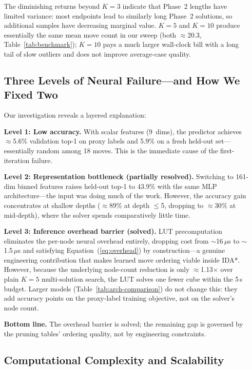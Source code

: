\documentclass[graybox]{svmult}
\begin{document}
The diminishing returns beyond $K{=}3$ indicate that Phase~2 lengths have limited variance: most endpoints lead to similarly long Phase~2 solutions, so additional samples have decreasing marginal value. $K{=}5$ and $K{=}10$ produce essentially the same mean move count in our sweep (both $\approx$20.3, Table~\ref{tab:benchmark}); $K{=}10$ pays a much larger wall-clock bill with a long tail of slow outliers and does not improve average-case quality.

\subsection{Three Levels of Neural Failure---and How We Fixed Two}

Our investigation reveals a layered explanation:

\textbf{Level 1: Low accuracy.} With scalar features (9~dims), the predictor achieves $\approx$5.6\% validation top-1 on proxy labels and 5.9\% on a fresh held-out set---essentially random among 18 moves. This is the immediate cause of the first-iteration failure.

\textbf{Level 2: Representation bottleneck (partially resolved).} Switching to 161-dim binned features raises held-out top-1 to 43.9\% with the same MLP architecture---the input was doing much of the work. However, the accuracy gain concentrates at shallow depths ($\approx$89\% at depth $\leq$5, dropping to $\approx$30\% at mid-depth), where the solver spends comparatively little time.

\textbf{Level 3: Inference overhead barrier (solved).} LUT precomputation eliminates the per-node neural overhead entirely, dropping cost from $\sim$16\,$\mu$s to $\sim$1.5\,$\mu$s and satisfying Equation~(\ref{eq:overhead}) by construction---a genuine engineering contribution that makes learned move ordering viable inside IDA*. However, because the underlying node-count reduction is only $\approx$1.13$\times$ over plain $K{=}5$ multi-solution search, the LUT solves one fewer cube within the 5\,s budget. Larger models (Table~\ref{tab:arch-comparison}) do not change this: they add accuracy points on the proxy-label training objective, not on the solver's node count.

\textbf{Bottom line.} The overhead barrier is solved; the remaining gap is governed by the pruning tables' ordering quality, not by engineering constraints.

\subsection{Computational Complexity and Scalability}
\label{sec:complexity}
\end{document}
